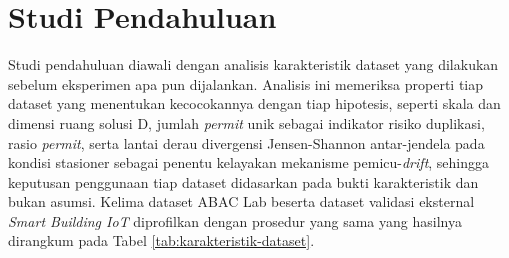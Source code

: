 \section{Studi Pendahuluan}

Studi pendahuluan diawali dengan analisis karakteristik dataset yang dilakukan sebelum eksperimen apa pun dijalankan.
Analisis ini memeriksa properti tiap dataset yang menentukan kecocokannya dengan tiap hipotesis, seperti skala dan dimensi ruang solusi D, jumlah \textit{permit} unik sebagai indikator risiko duplikasi, rasio \textit{permit}, serta lantai derau divergensi Jensen-Shannon antar-jendela pada kondisi stasioner sebagai penentu kelayakan mekanisme pemicu-\textit{drift}, sehingga keputusan penggunaan tiap dataset didasarkan pada bukti karakteristik dan bukan asumsi.
Kelima dataset ABAC Lab beserta dataset validasi eksternal \textit{Smart Building IoT} diprofilkan dengan prosedur yang sama yang hasilnya dirangkum pada Tabel \ref{tab:karakteristik-dataset}.

